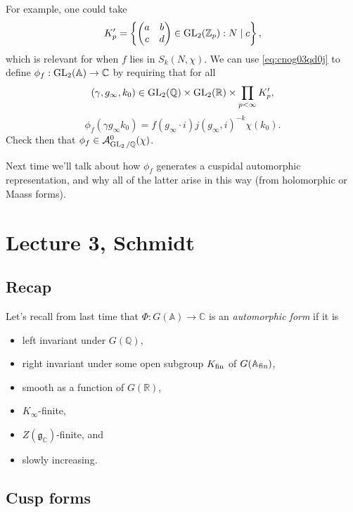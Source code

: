 \documentclass[reqno]{amsart} 
\begin{document}
For example, one could take
\begin{equation*}
  K_p ' = \left\{
    \begin{pmatrix}
      a      & b \\
      c & d \\
    \end{pmatrix} \in \operatorname{GL}_2(\mathbb{Z}_p) : N \mid c \right\},
\end{equation*}
which is relevant for when $f$ lies in $S_k(N, \chi)$.  We can use \eqref{eq:cnog03qd0j} to define $\phi_f : \operatorname{GL}_2(\mathbb{A}) \rightarrow \mathbb{C}$ by requiring that for all
\begin{equation*}
  (\gamma, g_\infty, k_0) \in \operatorname{GL}_2(\mathbb{Q}) \times \operatorname{GL}_2(\mathbb{R}) \times \prod_{p < \infty} K_p ',
\end{equation*}
\begin{equation*}
  \phi_f(\gamma g_\infty k_0) = f(g_\infty \cdot i) j(g_\infty, i)^{- k} \chi(k_0).
\end{equation*}
Check then that $\phi_f \in \mathcal{A}_{\operatorname{GL}_2 / \mathbb{Q}}^0(\chi)$.

Next time we'll talk about how $\phi_f$ generates a cuspidal automorphic representation, and why all of the latter arise in this way (from holomorphic or Maass forms).

\section{Lecture 3, Schmidt}

\subsection{Recap}

Let's recall from last time that $\Phi : G(\mathbb{A}) \rightarrow \mathbb{C}$ is an \emph{automorphic form} if it is
\begin{itemize}
\item left invariant under $G(\mathbb{Q})$, 
\item right invariant under some open subgroup $K_{\operatorname{fin}}$ of $G(\mathbb{A}_{\operatorname{fin}})$,
\item smooth as a function of $G(\mathbb{R})$,
\item $K_\infty$-finite,
\item $Z(\mathfrak{g}_{\mathbb{C}})$-finite, and
\item slowly increasing.
\end{itemize}

\subsection{Cusp forms}
\end{document}
